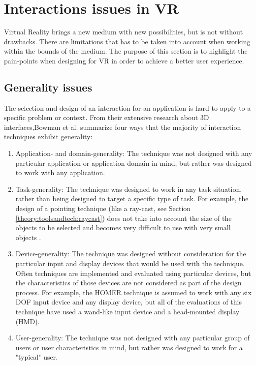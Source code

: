 \section{Interactions issues in VR}
\label{theory:interactionissues}
Virtual Reality brings a new medium with new possibilities, but is not without drawbacks. There are limitations that has to be taken into account when working within the bounds of the medium. The purpose of this section is to highlight the pain-points when designing for VR in order to achieve a better user experience.

\subsection{Generality issues}
The selection and design of an interaction for an application is hard to apply to a specific problem or context. From their extensive research about 3D interfaces,Bowman et al. \cite{interactions:Bowman2006} summarize four ways that the majority of interaction techniques exhibit generality:
\begin{enumerate}
  \item Application- and domain-generality: The technique was not designed with any particular application or application domain in mind, but rather was designed to work with any application.
  \item Task-generality: The technique was designed to work in any task situation, rather than being designed to target a specific type of task. For example, the design of a pointing technique (like a ray-cast, see Section \ref{theory:toolsandtech:raycast}) does not take into account the size of the objects to be selected and becomes very difficult to use with very small objects \cite{interaction:Poupyrev1997}.
  \item Device-generality: The technique was designed without consideration for the particular input and display devices that would be used with the technique. Often techniques are implemented and evaluated using particular devices, but the characteristics of those devices are not considered as part of the design process. For example, the HOMER technique\cite{interactions:Bowman1997} is assumed to work with any six DOF input device and any display device, but all of the evaluations of this technique have used a wand-like input device and a head-mounted display (HMD).
  \item User-generality: The technique was not designed with any particular group of users or user characteristics in mind, but rather was designed to work for a "typical" user.
\end{enumerate}

